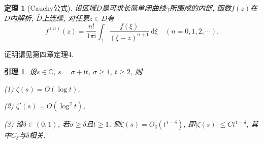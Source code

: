 \documentclass[12pt, a4paper, oneside]{ctexart}
\newtheorem{theorem}{定理}[section] %
\newtheorem{lemma}{引理}[section]
\numberwithin{equation}{section}  %
\let\leq=\leqslant %
\let\geq=\geqslant %
\def\C{\mathbb{C}}          %
\def\d{\mathrm{d}}          %
\def\i{\mathrm{i}}          %
\begin{document}
\begin{theorem}[Cauchy公式]
    设区域$D$是可求长简单闭曲线$\gamma$所围成的内部, 函数$f(z)$在$D$内解析, $\bar{D}$上连续, 对任意$z\in D$有
    \begin{equation*}
        f^{(n)}(z) = \frac{n!}{1\pi\i}\int_{\gamma}\frac{f(\xi)}{(\xi-z)^{n+1}}\,\d \xi\quad(n=0,1,2,\cdots).
    \end{equation*}
\end{theorem}
证明请见\cite{ref-复变函数}第四章定理4.
\begin{lemma}\label{lemma-upper}
    设$s\in\C$, $s= \sigma + \i t$, $\sigma \geq 1$, $t\geq 2$, 则

    (1) $\zeta(s) = O(\log t)$,

    (2) $\zeta'(s) = O(\log^2 t)$,

    (3) 设$\delta\in(0,1)$, 若$\sigma \geq \delta$且$t\geq 1$, 则$\zeta(s) = O_{\delta}(t^{1-\delta})$, 即$|\zeta(s)|\leq Ct^{1-\delta}$, 其中$C_{\delta}$与$\delta$相关.
\end{lemma}
\end{document}
